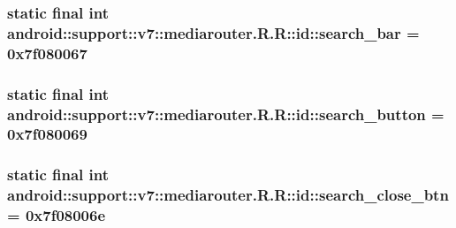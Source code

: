\hypertarget{classandroid_1_1support_1_1v7_1_1mediarouter_1_1_r_1_1id_e6b87a14fda66934b10a5c2d7067f2ac}{
\subsubsection[{search\_\-bar}]{\setlength{\rightskip}{0pt plus 5cm}static final int android::support::v7::mediarouter.R.R::id::search\_\-bar = 0x7f080067}}
\label{classandroid_1_1support_1_1v7_1_1mediarouter_1_1_r_1_1id_e6b87a14fda66934b10a5c2d7067f2ac}


\hypertarget{classandroid_1_1support_1_1v7_1_1mediarouter_1_1_r_1_1id_19eef9b0a9a82df0e95714e50006dc74}{
\subsubsection[{search\_\-button}]{\setlength{\rightskip}{0pt plus 5cm}static final int android::support::v7::mediarouter.R.R::id::search\_\-button = 0x7f080069}}
\label{classandroid_1_1support_1_1v7_1_1mediarouter_1_1_r_1_1id_19eef9b0a9a82df0e95714e50006dc74}


\hypertarget{classandroid_1_1support_1_1v7_1_1mediarouter_1_1_r_1_1id_cdf53579d63f0d7e571232e940a1e83c}{
\subsubsection[{search\_\-close\_\-btn}]{\setlength{\rightskip}{0pt plus 5cm}static final int android::support::v7::mediarouter.R.R::id::search\_\-close\_\-btn = 0x7f08006e}}
\label{classandroid_1_1support_1_1v7_1_1mediarouter_1_1_r_1_1id_cdf53579d63f0d7e571232e940a1e83c}


